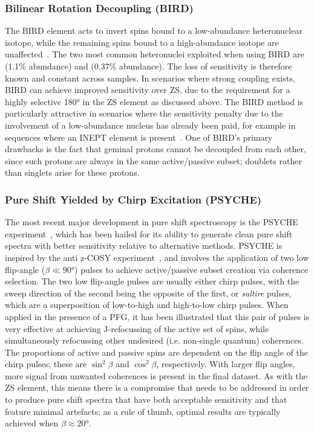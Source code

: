 \subsubsection{Bilinear Rotation Decoupling (BIRD)}
The \ac{BIRD} element acts to invert spins bound to a low-abundance
heteronuclear isotope, while the remaining spins bound to a high-abundance
isotope are unaffected~\cite{Garbow1982,Bax1983}.
The two most common heteronuclei exploited when using \ac{BIRD} are 
(1.1\% abundance) and  (0.37\% abundance). The loss of sensitivity
is therefore known and constant across samples. In scenarios where strong
coupling exists, \ac{BIRD} can achieve improved sensitivity over \ac{ZS}, due
to the requirement for a highly selective \ang{180} in the \ac{ZS} element as
discussed above.
The \ac{BIRD} method is particularly attractive in scenarios where the
sensitivity penalty due to the involvement of a low-abundance nucleus has
already been paid, for example in sequences where an \ac{INEPT} element is
present~\cite{Paudel2013}. One of \ac{BIRD}'s primary drawbacks is the fact that
geminal protons cannot be decoupled from each other, since such protons are
always in the same active/passive subset; doublets rather than singlets arise
for these protons.

\subsubsection{Pure Shift Yielded by Chirp Excitation (PSYCHE)}
\label{subsec:psyche}
The most recent major development in pure shift spectroscopy is the \ac{PSYCHE}
experiment~\cite{Foroozandeh2014,Foroozandeh2018}, which has been hailed for its
ability to generate clean pure shift spectra with better sensitivity relative to
alternative methods. \ac{PSYCHE} is inspired by
the anti z-\ac{COSY} experiment~\cite{Thrippleton2003}, and involves the application
of two low flip-angle ($\beta \ll \ang{90}$) pulses to achieve active/passive
subset creation via coherence selection. The two low flip-angle pulses
are usually either chirp pulses, with the sweep direction of the second being
the opposite of the first, or \emph{saltire} pulses, which are a superposition
of low-to-high and high-to-low chirp pulses. When applied in the presence of a
\ac{PFG}, it has been illustrated that this pair of pulses is very effective at
achieving J-refocussing of the active set of spins, while simultaneously
refocussing other undesired (i.e. non-single quantum) coherences.
The proportions of active and passive spins are dependent on the flip angle of
the chirp pulses; these are $\sin^2 \beta$ and $\cos^2 \beta$,
respectively. With larger flip angles, more signal from unwanted
coherences is present in the final dataset. As with the \ac{ZS} element, this
means there is a compromise that needs to be addressed in order to produce
pure shift spectra that have both acceptable sensitivity and that feature
minimal artefacts; as a rule of thumb, optimal results are typically achieved
when $\beta \approx \ang{20}$.

